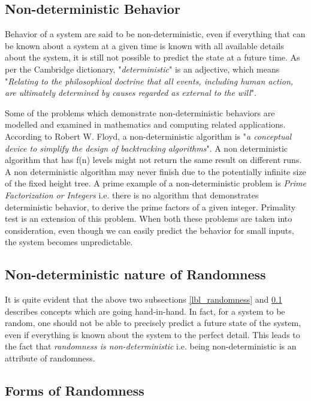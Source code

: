 \subsection{Non-deterministic Behavior}\label{lbl_nd_behave}

Behavior of a system are said to be non-deterministic, even if everything that can be known about a system at a given time is known with all available details about the system, it is still not possible to predict the state at a future time. As per the Cambridge dictionary, "\textit{deterministic}" is an adjective, which means "\textit{Relating to the philosophical doctrine that all events, including human action, are ultimately determined by causes regarded as external to the will}"\cite{web_cambridge_def_determin}.

Some of the problems which demonstrate non-deterministic behaviors are modelled and examined in mathematics and computing related applications. According to Robert W. Floyd, a non-deterministic algorithm is "\textit{a conceptual device to simplify the design of backtracking algorithms}"\cite{art_floyd_non_determin}. A non deterministic algorithm that has f(n) levels might not return the same result on different runs. A non deterministic algorithm may never finish due to the potentially infinite size of the fixed height tree. A prime example of a non-deterministic problem is \textit{Prime Factorization or Integers} i.e. there is no algorithm that demonstrates deterministic behavior, to derive the prime factors of a given integer. Primality test is an extension of this problem. When both these problems are taken into consideration, even though we can easily predict the behavior for small inputs, the system becomes unpredictable.

\subsection{Non-deterministic nature of Randomness}

It is quite evident that the above two subsections \ref{lbl_randomness} and \ref{lbl_nd_behave} describes concepts which are going hand-in-hand. In fact, for a system to be random, one should not be able to precisely predict a future state of the system, even if everything is known about the system to the perfect detail. This leads to the fact that \textit{randomness is non-deterministic} i.e. being non-deterministic is an attribute of randomness.

\subsection{Forms of Randomness}

